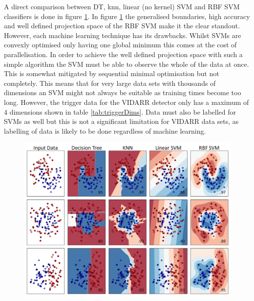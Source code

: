 A direct comparison between DT, knn, linear (no kernel) SVM and RBF SVM classifiers is done in figure \ref{fig:sklearnReleventExamples}. In figure \ref{fig:sklearnReleventExamples} the generalised boundaries, high accuracy and well defined projection space of the RBF SVM make it the clear standout. However, each machine learning technique has its drawbacks. Whilst SVMs are convexly optimised only having one global minimum \cite{Boser92atraining} this comes at the cost of parallelisation. In order to achieve the well defined projection space with such a simple algorithm the SVM must be able to observe the whole of the data at once. This is somewhat mitigated by sequential minimal optimisation \cite{platt1998sequential} but not completely. This means that for very large data sets with thousands of dimensions an SVM might not always be suitable as training times become too long. However, the trigger data for the VIDARR detector only has a maximum of 4 dimensions shown in table \ref{tab:triggerDims}. Data must also be labelled for SVMs as well but this is not a significant limitation for VIDARR data sets, as labelling of data is likely to be done regardless of machine learning.
 
\begin{figure}[!h]
\centering
\includegraphics[width=0.9\linewidth]{Chapter4/Figs/Raster/svmLinAndRbf/sklearnReleventExamplesMedText.png}
\label{fig:sklearnReleventExamples}
\end{figure}

